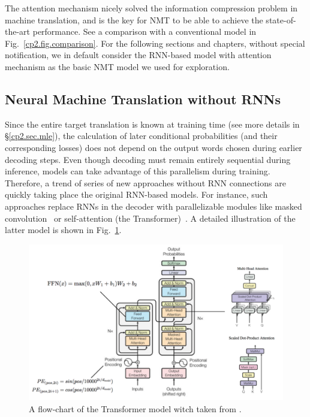 The attention mechanism nicely solved the information compression problem in machine translation, and is the key for NMT to be able to achieve the state-of-the-art performance. See a comparison with a conventional \sts model in Fig.~\ref{cp2.fig.comparison}. For the following sections and chapters, without special notification, we in default consider the RNN-based \sts model with attention mechanism as the basic NMT model we used for exploration. 



\subsection{Neural Machine Translation without RNNs}
Since the entire target translation is known at training time (see more details in \S\ref{cp2.sec.mle}), the calculation of later conditional probabilities (and their corresponding losses) does not depend on the output words chosen during earlier decoding steps. 
Even though decoding must remain entirely sequential during inference, models can take advantage of this parallelism during training. Therefore, a trend of series of new approaches without RNN connections are quickly taking place the original RNN-based models.
For instance, such approaches replace RNNs in the decoder with parallelizable modules like  masked convolution~\cite{kalchbrenner2016neural, gehring2017convolutional} or self-attention (the Transformer)~\cite{vaswani2017attention}. A detailed illustration of the latter model is shown in Fig.~\ref{cp2.fig.transformer}. %
\begin{figure}[hptb]
	\includegraphics[width=\linewidth]{figs/background/transformer.pdf}
	\caption{\label{cp2.fig.transformer} A flow-chart of the Transformer model witch taken from . }
\end{figure}

